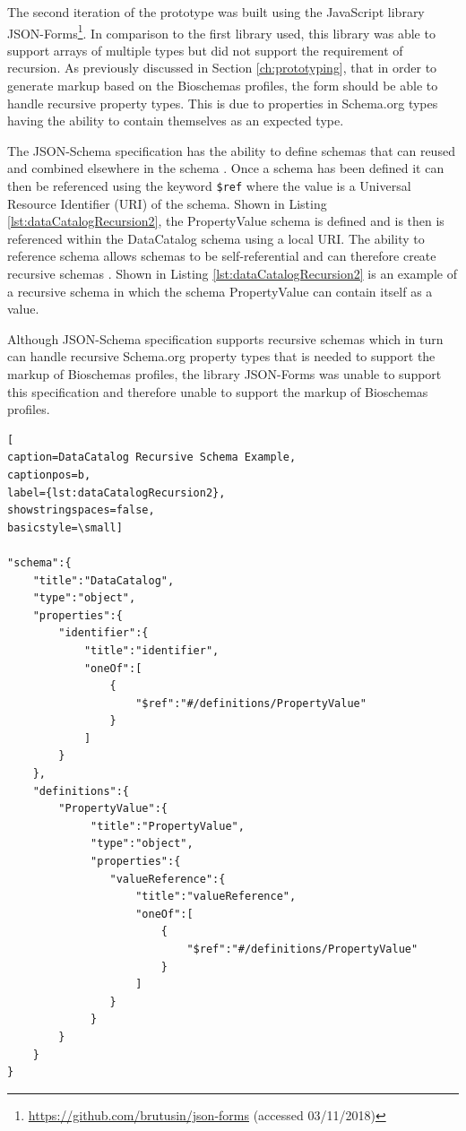 \newpage
{
The second iteration of the prototype was built using the JavaScript library JSON-Forms\footnote{\url{https://github.com/brutusin/json-forms} (accessed 03/11/2018)}. In comparison to the first library used, this library was able to support arrays of multiple types but did not support the requirement of recursion. As previously discussed in Section \ref{ch:prototyping}, that in order to generate markup based on the Bioschemas profiles, the form should be able to handle recursive property types. This is due to properties in Schema.org types having the ability to contain themselves as an expected type.

The JSON-Schema specification has the ability to define schemas that can reused and combined elsewhere in the schema \cite{jsonSchemaComplex}. Once a schema has been defined it can then be referenced using the keyword \texttt{\$ref} where the value is a Universal Resource Identifier (URI) of the schema. Shown in Listing \ref{lst:dataCatalogRecursion2}, the PropertyValue schema is defined and is then is referenced within the DataCatalog schema using a local URI. The ability to reference schema allows schemas to be self-referential and can therefore create recursive schemas \cite{jsonSchemaComplex}. Shown in Listing \ref{lst:dataCatalogRecursion2} is an example of a recursive schema in which the schema PropertyValue can contain itself as a value.

Although JSON-Schema specification supports recursive schemas which in turn can handle recursive Schema.org property types that is needed to support the markup of Bioschemas profiles, the library JSON-Forms was unable to support this specification and therefore unable to support the markup of Bioschemas profiles.
}


{
\begin{center}
\begin{lstlisting}[
caption=DataCatalog Recursive Schema Example,
captionpos=b,
label={lst:dataCatalogRecursion2},
showstringspaces=false,
basicstyle=\small]

"schema":{
    "title":"DataCatalog",
    "type":"object",
    "properties":{
        "identifier":{
            "title":"identifier",
            "oneOf":[
                {
                    "$ref":"#/definitions/PropertyValue"
                }
            ]
        }
    },
    "definitions":{
        "PropertyValue":{
             "title":"PropertyValue",
             "type":"object",
             "properties":{
                "valueReference":{
                    "title":"valueReference",
                    "oneOf":[
                        {
                            "$ref":"#/definitions/PropertyValue"
                        }
                    ]
                }
             }
        }
    }
}

\end{lstlisting}  
\end{center}
}


